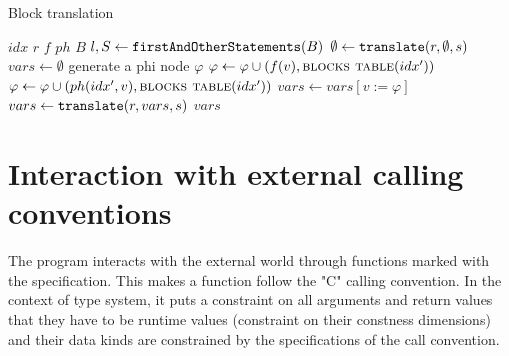 \begin{algorithm}
    \caption{Block translation}
    \label{transl_block}
    \begin{algorithmic}[1]
        \Require $idx$ 
        \Require $r$ 
        \Require $f$ 
        \Require $ph$ 
        \Require $B$ 
        \State $l, S \gets \mathtt{firstAndOtherStatements}(B)$
        \State $\emptyset \gets \mathtt{translate}(r, \emptyset, s)$ 
        \State $vars \gets \emptyset$ 
            \State generate a phi node $\varphi$
                    \State $\varphi \gets \varphi \cup (f(v), \text{\textsc{blocks table}}(idx'))$
                \Else
                    \State $\varphi \gets \varphi \cup (ph(idx', v), \text{\textsc{blocks table}}(idx'))$
                \EndIf {}
            \EndFor
            \State $vars \gets vars[v := \varphi]$ 
        \EndFor
            \State $vars \gets \mathtt{translate} (r, vars, s)$ 
        \EndFor
        \State \Return $vars$
    \end{algorithmic}
\end{algorithm}


\section{Interaction with external calling conventions}

The program interacts with the external world through functions marked with the  specification. This makes a function follow the "C" calling convention. In the context of type system, it puts a constraint on all arguments and return values that they have to be runtime values (constraint on their constness dimensions) and their data kinds are constrained by the specifications of the call convention.
